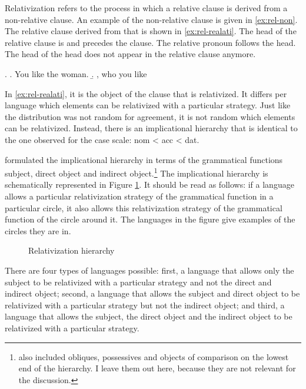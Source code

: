 Relativization refers to the process in which a relative clause is derived from a non-relative clause. An example of the non-relative clause is given in \ref{ex:rel-non}. The relative clause derived from that is shown in \ref{ex:rel-realati}. The head of the relative clause is  and precedes the clause. The relative pronoun follows the head. The head of the head does not appear in the relative clause anymore.

\ex.
\a. You like the woman. \label{ex:rel-non}
\b.  , who you like \label{ex:rel-realati}

In \ref{ex:rel-realati}, it is the object of the clause that is relativized. It differs per language which elements can be relativized with a particular strategy. Just like the distribution was not random for agreement, it is not random which elements can be relativized. Instead, there is an implicational hierarchy that is identical to the one observed for the case scale: \ac{nom} < \ac{acc} < \ac{dat}.

\citet{keenan1977} formulated the implicational hierarchy in terms of the grammatical functions subject, direct object and indirect object.\footnote{
\citet{keenan1977} also included obliques, possessives and objects of comparison on the lowest end of the hierarchy. I leave them out here, because they are not relevant for the discussion.
}
The implicational hierarchy is schematically represented in Figure \ref{fig:rel-sub-do-io}. It should be read as follows: if a language allows a particular relativization strategy of the grammatical function in a particular circle, it also allows this relativization strategy of the grammatical function of the circle around it. The languages in the figure give examples of the circles they are in.

\begin{figure}[ht]
  \centering
  \caption{Relativization hierarchy}
  \label{fig:rel-sub-do-io}
\end{figure}

There are four types of languages possible: first, a language that allows only the subject to be relativized with a particular strategy and not the direct and indirect object; second, a language that allows the subject and direct object to be relativized with a particular strategy but not the indirect object; and third, a language that allows the subject, the direct object and the indirect object to be relativized with a particular strategy.

